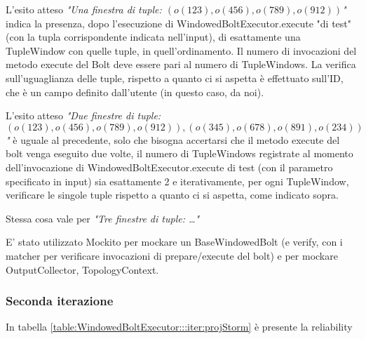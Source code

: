 \documentclass[10pt, a4paper]{article}
\newcommand{\gettablelabel}[5]{table:#1:#2:#3:iter#4:proj#5}
\newcommand{\getreltablelabel}[2]{\gettablelabel{#1}{}{}{}{#2}}
\def\storm{Storm}
\begin{document}
	L'esito atteso \textit{"Una finestra di tuple: $(o(123),o(456),o(789),o(912))$"} indica la presenza, dopo l'esecuzione
	di WindowedBoltExecutor.execute "di test" (con la tupla corrispondente indicata nell'input), di esattamente una TupleWindow
	con quelle tuple, in quell'ordinamento. Il numero di invocazioni del metodo execute del Bolt deve essere pari al numero di
	TupleWindows. La verifica sull'uguaglianza delle tuple, rispetto a quanto ci si aspetta è effettuato sull'ID, 
	che è un campo definito dall'utente (in questo caso, da noi).
	
	L'esito atteso \textit{"Due finestre di tuple: $(o(123),o(456),o(789),o(912)),(o(345),o(678),o(891),o(234))$"} è uguale
	al precedente, solo che bisogna accertarsi che il metodo execute del bolt venga eseguito due volte, il numero di 
	TupleWindows registrate al momento dell'invocazione di WindowedBoltExecutor.execute di test (con il parametro specificato
	in input) sia esattamente 2 e iterativamente, per ogni TupleWindow, verificare le singole tuple rispetto a quanto ci si
	aspetta, come indicato sopra.
	
	Stessa cosa vale per \textit{"Tre finestre di tuple: \dots"}
	
	E' stato utilizzato Mockito per mockare un BaseWindowedBolt (e verify, con i matcher per verificare invocazioni di
	prepare/execute del bolt) e per mockare OutputCollector, TopologyContext.
	
	\subsubsection{Seconda iterazione}
	
	In tabella \ref{\getreltablelabel{WindowedBoltExecutor}{\storm}} è presente la reliability
	
	\newpage
\end{document}
